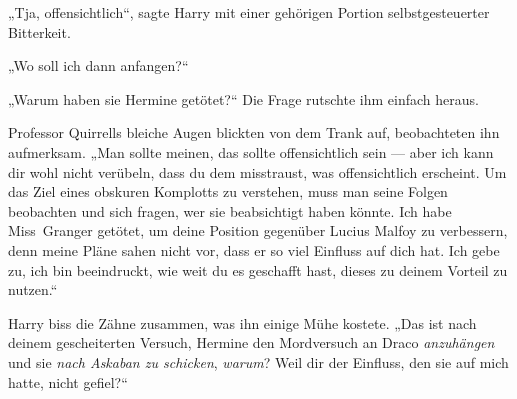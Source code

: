 „Tja, offensichtlich“, sagte Harry mit einer gehörigen Portion selbstgesteuerter Bitterkeit.

„Wo soll ich dann anfangen?“

„Warum haben sie Hermine getötet?“
Die Frage rutschte ihm einfach heraus.

Professor Quirrells bleiche Augen blickten von dem Trank auf, beobachteten ihn aufmerksam.
„Man sollte meinen, das sollte offensichtlich sein — aber ich kann dir wohl nicht verübeln, dass du dem misstraust, was offensichtlich erscheint. Um das Ziel eines obskuren Komplotts zu verstehen, muss man seine Folgen beobachten und sich fragen, wer sie beabsichtigt haben könnte. Ich habe Miss~Granger getötet, um deine Position gegenüber Lucius Malfoy zu verbessern, denn meine Pläne sahen nicht vor, dass er so viel Einfluss auf dich hat. Ich gebe zu, ich bin beeindruckt, wie weit du es geschafft hast, dieses zu deinem Vorteil zu nutzen.“

Harry biss die Zähne zusammen, was ihn einige Mühe kostete.
„Das ist nach deinem gescheiterten Versuch, Hermine den Mordversuch an Draco \emph{anzuhängen} und sie \emph{nach Askaban zu schicken}, \emph{warum}? Weil dir der Einfluss, den sie auf mich hatte, nicht gefiel?“

